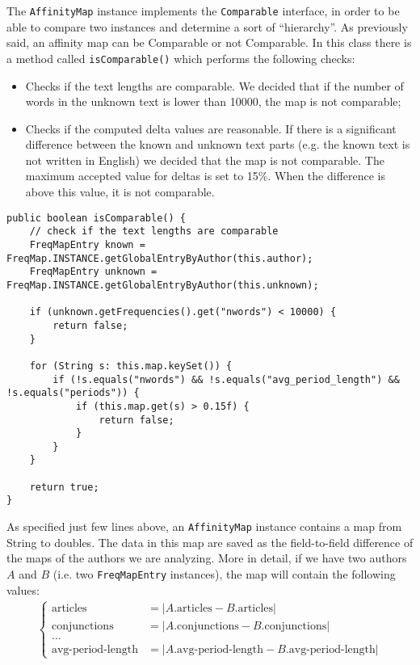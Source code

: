 \documentclass[a4paper,11pt, twoside]{article}
\begin{document}
		\noindent
		The \lstinline|AffinityMap| instance implements the \lstinline|Comparable| interface, in order to be able to compare two instances and determine a sort of ``hierarchy''. As previously said, an affinity map can be Comparable or not Comparable. In this class there is a method called \lstinline|isComparable()| which performs the following checks:
		\begin{itemize}
			\item Checks if the text lengths are comparable. We decided that if the number of words in the unknown text is lower than 10000, the map is not comparable;
			\item Checks if the computed delta values are reasonable. If there is a significant difference between the known and unknown text parts (e.g. the known text is not written in English) we decided that the map is not comparable. The maximum accepted value for deltas is set to 15\%. When the difference is above this value, it is not comparable. 
		\end{itemize}

		\begin{lstlisting}[firstnumber=43,caption={AffinityMap isComparable method}, captionpos=b, label={lst:iscomparablemethod}]
public boolean isComparable() {
	// check if the text lengths are comparable
	FreqMapEntry known = FreqMap.INSTANCE.getGlobalEntryByAuthor(this.author);
	FreqMapEntry unknown = FreqMap.INSTANCE.getGlobalEntryByAuthor(this.unknown);

	if (unknown.getFrequencies().get("nwords") < 10000) {
		return false;
	}

	for (String s: this.map.keySet()) {
		if (!s.equals("nwords") && !s.equals("avg_period_length") && !s.equals("periods")) {
			if (this.map.get(s) > 0.15f) {
				return false;
			}
		}
	}

	return true;
}
		\end{lstlisting}

	\noindent
	As specified just few lines above, an \lstinline|AffinityMap| instance contains a map from String to doubles. The data in this map are saved as the field-to-field difference of the maps of the authors we are analyzing. More in detail, if we have two authors $A$ and $B$ (i.e. two \lstinline|FreqMapEntry| instances), the map will contain the following values:
	\begin{align*}
		\begin{cases}
			\text{articles} &= |A.\text{articles} - B.\text{articles}| \\
			\text{conjunctions} &= |A. \text{conjunctions}- B.\text{conjunctions}| \\
			\dots& \\
			\text{avg-period-length}&= |A.\text{avg-period-length} - B.\text{avg-period-length}|
		\end{cases}
	\end{align*}
\end{document}
